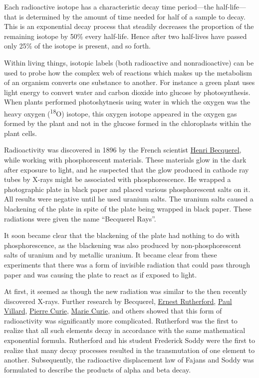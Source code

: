 Each radioactive isotope has a characteristic decay time period---the
half-life---that is determined by the amount of time needed for half of
a sample to decay. This is an exponential decay process that steadily
decreases the proportion of the remaining isotope by 50\% every
half-life. Hence after two half-lives have passed only 25\% of the
isotope is present, and so forth.

Within living things, isotopic labels (both radioactive and
nonradioactive) can be used to probe how the complex web of reactions
which makes up the metabolism of an organism converts one substance to
another. For instance a green plant uses light energy to convert water
and carbon dioxide into glucose by photosynthesis. When plants performed
photoshytnesis using water in which the oxygen was the heavy oxygen
(\textsuperscript{18}O) isotope, this oxygen isotope appeared in the
oxygen gas formed by the plant and not in the glucose formed in the
chloroplasts within the plant cells.

Radioactivity was discovered in 1896 by the French scientist
\href{https://en.wikipedia.org/wiki/Henri_Becquerel}{Henri Becquerel},
while working with phosphorescent materials. These materials glow in the
dark after exposure to light, and he suspected that the glow produced in
cathode ray tubes by X-rays might be associated with phosphorescence. He
wrapped a photographic plate in black paper and placed various
phosphorescent salts on it. All results were negative until he used
uranium salts. The uranium salts caused a blackening of the plate in
spite of the plate being wrapped in black paper. These radiations were
given the name ``Becquerel Rays''.

It soon became clear that the blackening of the plate had nothing to do
with phosphorescence, as the blackening was also produced by
non-phosphorescent salts of uranium and by metallic uranium. It became
clear from these experiments that there was a form of invisible
radiation that could pass through paper and was causing the plate to
react as if exposed to light.

At first, it seemed as though the new radiation was similar to the then
recently discovered X-rays. Further research by Becquerel,
\href{https://en.wikipedia.org/wiki/Ernest_Rutherford}{Ernest
Rutherford},
\href{https://en.wikipedia.org/wiki/Paul_Ulrich_Villard}{Paul Villard},
\href{https://en.wikipedia.org/wiki/Pierre_Curie}{Pierre Curie},
\href{https://en.wikipedia.org/wiki/Marie_Curie}{Marie Curie}, and
others showed that this form of radioactivity was significantly more
complicated. Rutherford was the first to realize that all such elements
decay in accordance with the same mathematical exponential formula.
Rutherford and his student Frederick Soddy were the first to realize
that many decay processes resulted in the transmutation of one element
to another. Subsequently, the radioactive displacement law of Fajans and
Soddy was formulated to describe the products of alpha and beta decay.

